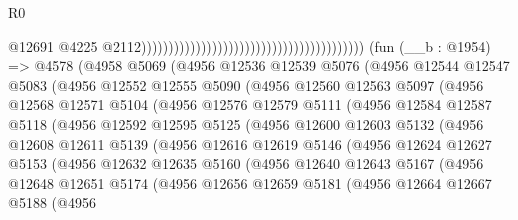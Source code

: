 \begin{lexlean}{R0}
\begin{coremodule}
                                                                                      @12691
                                                                                      @4225
                                                                                      @2112)))))))))))))))))))))))))))))))))))))))))
    (fun (__b : @1954) =>
    @4578
      (@4958
        @5069
        (@4956
          @12536
          @12539
          @5076
          (@4956
            @12544
            @12547
            @5083
            (@4956
              @12552
              @12555
              @5090
              (@4956
                @12560
                @12563
                @5097
                (@4956
                  @12568
                  @12571
                  @5104
                  (@4956
                    @12576
                    @12579
                    @5111
                    (@4956
                      @12584
                      @12587
                      @5118
                      (@4956
                        @12592
                        @12595
                        @5125
                        (@4956
                          @12600
                          @12603
                          @5132
                          (@4956
                            @12608
                            @12611
                            @5139
                            (@4956
                              @12616
                              @12619
                              @5146
                              (@4956
                                @12624
                                @12627
                                @5153
                                (@4956
                                  @12632
                                  @12635
                                  @5160
                                  (@4956
                                    @12640
                                    @12643
                                    @5167
                                    (@4956
                                      @12648
                                      @12651
                                      @5174
                                      (@4956
                                        @12656
                                        @12659
                                        @5181
                                        (@4956
                                          @12664
                                          @12667
                                          @5188
                                          (@4956

\end{coremodule}
\end{lexlean}
